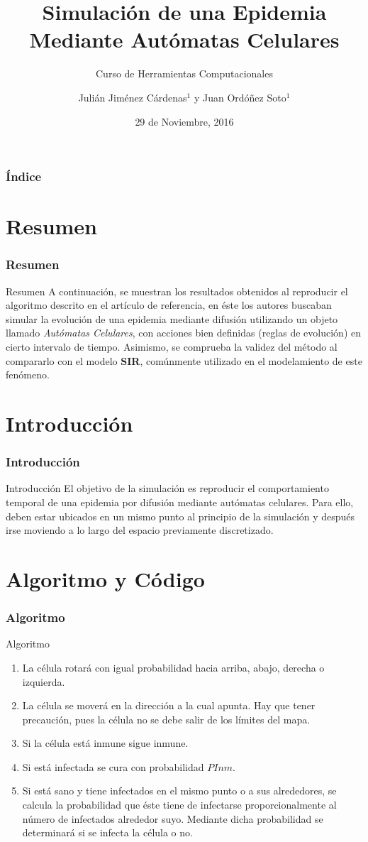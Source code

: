 \documentclass{beamer}
\title[Simulación de una Epidemia Mediante Autómatas Celulares]{Simulación de una Epidemia Mediante Autómatas Celulares}
\subtitle{Curso de Herramientas Computacionales}
\author[Jiménez, Ordóñez. Universidad Nacional de Colombia]{Julián Jiménez Cárdenas$^{1}$ y Juan Ordóñez Soto$^{1}$}
\institute{$^{1}$Curso de Herramientas Computacionales, Universidad Nacional de Colombia, Bogotá. \and \texttt{juojimenezca@unal.edu.co}\and \texttt{jsordonezs@unal.edu.co}}
\date{29 de Noviembre, 2016}
\begin{document}
	\frame{\titlepage}
	
	\begin{frame}
		\frametitle{Índice}
		\tableofcontents		
	\end{frame}
	\section{Resumen}	
	\begin{frame}
	\frametitle{Resumen}
	\begin{block}{Resumen}
	A continuación, se muestran los resultados obtenidos al reproducir el algoritmo descrito en el artículo de referencia, en éste los autores buscaban simular la evolución de una epidemia mediante difusión utilizando un objeto llamado \emph{Autómatas Celulares}, con acciones bien definidas (reglas de evolución) en cierto intervalo de tiempo. Asimismo, se comprueba la validez del método al compararlo con el modelo \textbf{SIR}, comúnmente utilizado en el modelamiento de este fenómeno.
	\end{block}
	\end{frame}
		\section{Introducción}	
	\begin{frame}
	\frametitle{Introducción}
	\begin{block}{Introducción}
	El objetivo de la simulación es reproducir el comportamiento temporal de una epidemia por difusión mediante autómatas celulares. Para ello, deben estar ubicados en un mismo punto al principio de la simulación y después irse moviendo a lo largo del espacio previamente discretizado.
	\end{block}
	\end{frame}
		\section{Algoritmo y Código}	
	\begin{frame}
\frametitle{Algoritmo}
\begin{block}{Algoritmo}

\begin{enumerate}
\item La célula rotará con igual probabilidad hacia arriba, abajo, derecha o izquierda.
\item La célula se moverá en la dirección a la cual apunta. Hay que tener precaución, pues la célula no se debe salir de los límites del mapa.


\item Si la célula está inmune sigue inmune.
\item Si está infectada se cura con probabilidad $PInm$.
\item Si está sano y tiene infectados en el mismo punto o a sus alrededores, se calcula la probabilidad que éste tiene de infectarse proporcionalmente al número de infectados alrededor suyo. Mediante dicha probabilidad se determinará si se infecta la célula o no.
\end{enumerate}
\end{block}


\end{frame}
\end{document}
